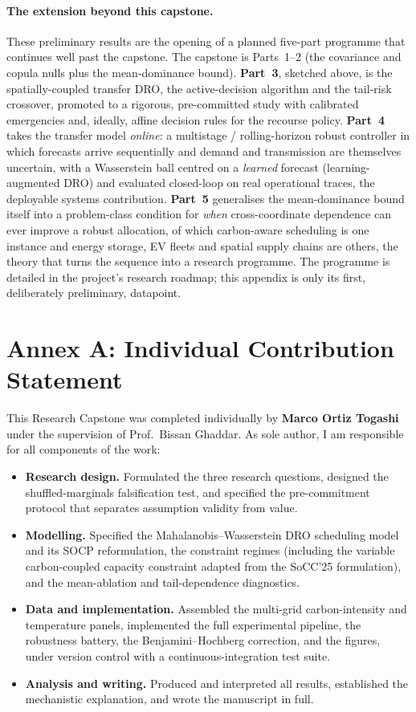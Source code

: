 \documentclass[10pt,twocolumn]{article}
\begin{document}
\paragraph{The extension beyond this capstone.} These preliminary results are the
opening of a planned five-part programme that continues well past the capstone. The
capstone is Parts~1--2 (the covariance and copula nulls plus the mean-dominance
bound). \textbf{Part~3}, sketched above, is the spatially-coupled transfer DRO, the active-decision algorithm and the tail-risk crossover, promoted to a rigorous,
pre-committed study with calibrated emergencies and, ideally, affine decision rules
for the recourse policy. \textbf{Part~4} takes the transfer model \emph{online}: a
multistage / rolling-horizon robust controller in which forecasts arrive
sequentially and demand and transmission are themselves uncertain, with a Wasserstein
ball centred on a \emph{learned} forecast (learning-augmented DRO) and evaluated
closed-loop on real operational traces, the deployable systems contribution.
\textbf{Part~5} generalises the mean-dominance bound itself into a problem-class
condition for \emph{when} cross-coordinate dependence can ever improve a robust
allocation, of which carbon-aware scheduling is one instance and energy storage, EV
fleets and spatial supply chains are others, the theory that turns the sequence
into a research programme. The programme is detailed in the project's research
roadmap; this appendix is only its first, deliberately preliminary, datapoint.

\section*{Annex A: Individual Contribution Statement}\label{app:ics}

This Research Capstone was completed individually by \textbf{Marco Ortiz Togashi}
under the supervision of Prof.\ Bissan Ghaddar. As sole author, I am responsible
for all components of the work:

\begin{itemize}[leftmargin=1.4em,itemsep=2pt]
\item \textbf{Research design.} Formulated the three research questions, designed
the shuffled-marginals falsification test, and specified the pre-commitment
protocol that separates assumption validity from value.
\item \textbf{Modelling.} Specified the Mahalanobis--Wasserstein DRO scheduling
model and its SOCP reformulation, the constraint regimes (including the variable
carbon-coupled capacity constraint adapted from the SoCC'25 formulation), and the
mean-ablation and tail-dependence diagnostics.
\item \textbf{Data and implementation.} Assembled the multi-grid carbon-intensity
and temperature panels, implemented the full experimental pipeline, the robustness
battery, the Benjamini--Hochberg correction, and the figures, under
version control with a continuous-integration test suite.
\item \textbf{Analysis and writing.} Produced and interpreted all results,
established the mechanistic explanation, and wrote the manuscript in full.
\end{itemize}
\end{document}
